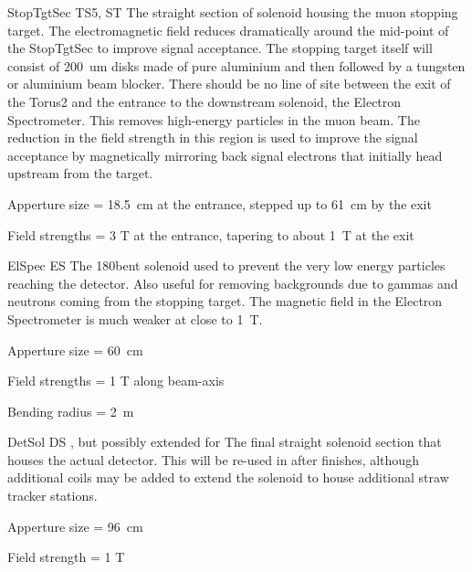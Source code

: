 {StopTgtSec}
{TS5, ST}
{\phaseII}
{The straight section of solenoid housing the muon stopping target.  The
electromagnetic field reduces dramatically around the mid-point of the
StopTgtSec to improve signal acceptance.  The stopping target itself will
consist of 200~um disks made of pure aluminium and then followed by a
tungsten or aluminium beam blocker.  There should be no line of site between
the exit of the Torus2 and the entrance to the downstream solenoid, the
Electron Spectrometer.  This removes high-energy particles in the muon beam.
The reduction in the field strength in this region is used to improve the
signal acceptance by magnetically mirroring back signal electrons that initially head
upstream from the target.
}
{\item Apperture size = 18.5~cm at the entrance, stepped up to  61~cm by the exit
 \item Field strengths = 3 T at the entrance, tapering to about 1~T at the exit}

{ElSpec}
{ES}
{\phaseII}
{The 180\degree bent solenoid used to prevent the very low energy particles reaching the detector.  Also useful for removing backgrounds due to gammas and neutrons coming from the stopping target.  The magnetic field in the Electron Spectrometer is much weaker at close to 1~T.}
{\item Apperture size = 60~cm
 \item Field strengths = 1 T along beam-axis
 \item Bending radius = 2~m}

{DetSol}
{DS}
{\phaseI, but possibly extended for \phaseII}
{The final straight solenoid section that houses the actual detector.  This will be re-used in \phaseII after \phaseI finishes, although additional coils may be added to extend the solenoid to house additional straw tracker stations.  }
{\item Apperture size = 96~cm
 \item Field strength = 1 T}

